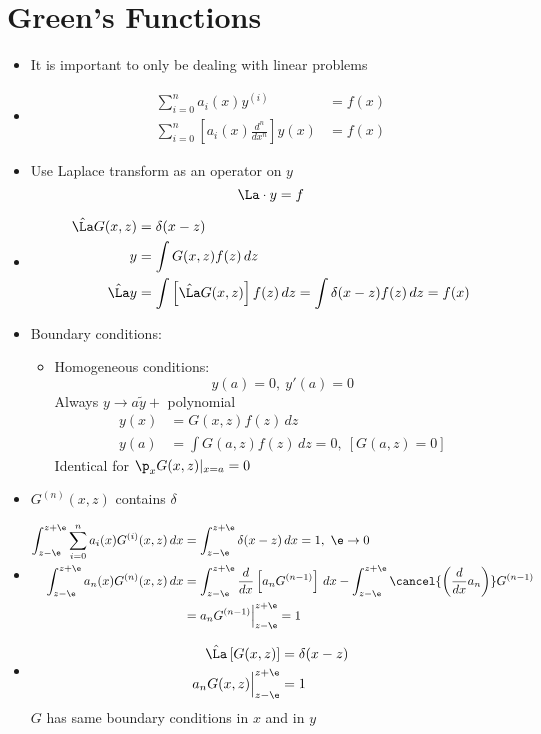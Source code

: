 \documentclass[Maths.tex]{subfiles}
\begin{document}
\section{Green's Functions}

\begin{itemize}
    \item It is important to only be dealing with linear problems
    \item
    \begin{align}
        \sum_{i=0}^n a_i(x)y^{(i)} &= f(x) \\
        \sum_{i=0}^n \left[a_i(x)\frac{d^n}{dx^n}\right]y(x) &= f(x)
    \end{align}
    \item Use Laplace transform as an operator on $y$
    \begin{equation}
        \La \cdot y = f
    \end{equation}
    \item
    \begin{align}
        \hat{\La} G(x,z) &= \delta(x-z) \\
        y &= \int G(x,z)f(z)\,dz \\
        \hat{\La} y &= \int \left[\hat{\La}G(x,z)\right] f(z)\,dz = \int \delta(x-z)f(z)\,dz = f(x)
    \end{align}
    \item Boundary conditions:
    \begin{itemize}
        \item Homogeneous conditions:
        \begin{equation}
            y(a) = 0,~ y'(a) = 0
        \end{equation}
        Always $y \to a\tilde{y} +$ polynomial
        \begin{align}
            y(x) &= G(x,z)f(z)\,dz \\
            y(a) &= \int G(a,z)f(z)\,dz = 0, ~[G(a,z) = 0]
        \end{align}
        Identical for $\p_x G(x,z)|_{x=a} = 0$
    \end{itemize}
    \item $G^{(n)}(x,z)$ contains $\delta$
    \item
    \begin{align}
        \grint \sum_{i=0}^n a_i(x)G^{(i)}(x,z)\,dx &= \grint \delta(x-z)\,dx = 1,~ \e \to 0 \\
        \grint a_n(x)G^{(n)}(x,z)\,dx &= \grint \frac{d}{dx}\left[a_nG^{(n-1)}\right]\,dx - \grint \cancel{\left(\frac{d}{dx}a_n\right)}G^{(n-1)} \\
        &= a_nG^{(n-1)}\Big|_{z-\e}^{z+\e} = 1
    \end{align}
    \item
    \begin{align}
        \hat{\La}\left[G(x,z)\right] &= \delta(x-z) \\
        a_nG(x,z)\Big|_{z-\e}^{z+\e} &= 1
    \end{align}
    $G$ has same boundary conditions in $x$ and in $y$
\end{itemize}
\end{document}

